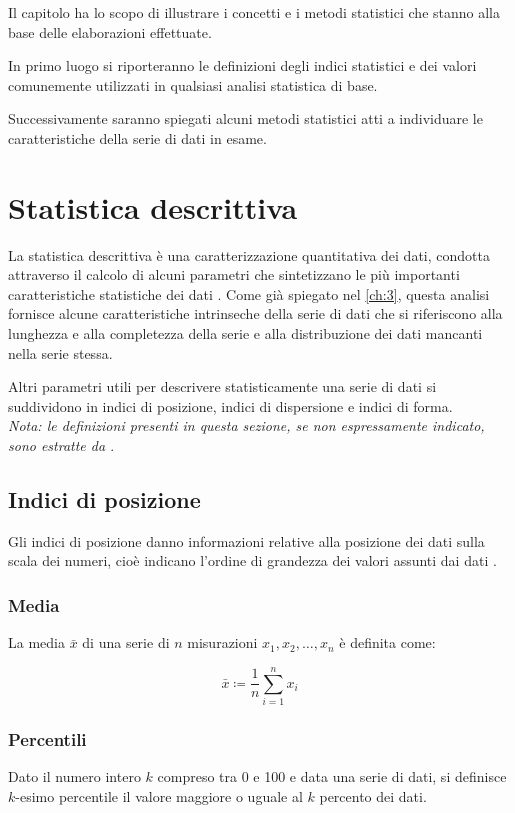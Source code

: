 Il capitolo ha lo scopo di illustrare i concetti e i metodi statistici che stanno alla base delle elaborazioni effettuate.

In primo luogo si riporteranno le definizioni degli indici statistici e dei valori comunemente utilizzati in qualsiasi analisi statistica di base.

Successivamente saranno spiegati alcuni metodi statistici atti a individuare le caratteristiche della serie di dati in esame.

\section{Statistica descrittiva}
\label{sec:stat_desc}
La statistica descrittiva è una caratterizzazione quantitativa dei dati, condotta attraverso il calcolo di alcuni parametri che sintetizzano le più importanti caratteristiche statistiche dei dati \cite{book}. Come già spiegato nel \autoref{ch:3}, questa analisi fornisce alcune caratteristiche intrinseche della serie di dati che si riferiscono alla lunghezza e alla completezza della serie e alla distribuzione dei dati mancanti nella serie stessa.

Altri parametri utili per descrivere statisticamente una serie di dati si suddividono in indici di posizione, indici di dispersione e indici di forma.\\

\textit{Nota: le definizioni presenti in questa sezione, se non espressamente indicato, sono estratte da \cite{ross2008probabilita}}.

\subsection{Indici di posizione}
\label{sec:ind_pos}
Gli indici di posizione danno informazioni relative alla posizione dei dati sulla scala dei numeri, cioè indicano l'ordine di grandezza dei valori assunti dai dati \cite{book}.
\subsubsection{Media}
La media $\bar{x}$ di una serie di $n$ misurazioni $x_{1}, x_{2},\dots, x_{n}$ è definita come:

\begin{equation}
\bar{x}\coloneqq\frac{1}{n}\sum_{i=1}^{n}x_{i}
\end{equation}

\subsubsection{Percentili}
Dato il numero intero $k$ compreso tra 0 e 100 e data una serie di dati, si definisce $k$-esimo percentile il valore maggiore o uguale al $k$ percento dei dati.

